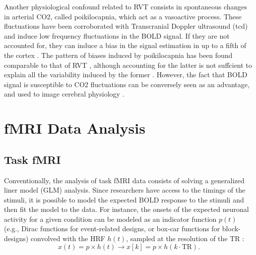 Another physiological confound related to RVT consists in spontaneous changes in
arterial CO2, called poikilocapnia, which act as a vasoactive process. These
fluctuations have been corroborated with Transcranial Doppler ultrasound
(\acrshort*{tcd}) and induce low frequency fluctuations in the BOLD signal. If
they are not accounted for, they can induce a bias in the signal estimation in
up to a fifth of the cortex \citep{Wise2004Restingfluctuationsarterial}. The
pattern of biases induced by poikilocapnia has been found comparable to that of
RVT \citep{Chang2009Relationshiprespirationend}, although accounting for the
latter is not suffcient to explain all the variability induced by the former
\citep{Golestani2015Mappingendtidal}. However, the fact that BOLD signal is
susceptible to CO2 fluctuations can be conversely seen as an advantage, and used
to image cerebral physiology
\citep{Pinto2021CerebrovascularReactivityMapping,Zvolanek2023Comparingendtidal,Moia2021ICAbaseddenoising}.

\section{fMRI Data Analysis}

\subsection{Task fMRI}

Conventionally, the analysis of task fMRI data consists of solving a generalized
liner model (GLM) analysis. Since researchers have access to the timings of the
stimuli, it is possible to model the expected BOLD response to the stimuli and
then fit the model to the data. For instance, the onsets of the expected
neuronal activity for a given condition can be modeled as an indicator function
$p(t)$ (e.g., Dirac functions for event-related designs, or box-car functions
for block-designs) convolved with the HRF $h(t)$, sampled at the resolution of
the TR
\citep{Friston2008DEMvariationaltreatment,Friston1998EventRelatedfMRI,Boynton1996LinearSystemsAnalysis,Cohen1997ParametricAnalysisfMRI}:
\begin{equation}
    x(t) = p \times h(t) \rightarrow x\left[k\right] = p \times h(k \cdot \text{TR}).
\end{equation}

